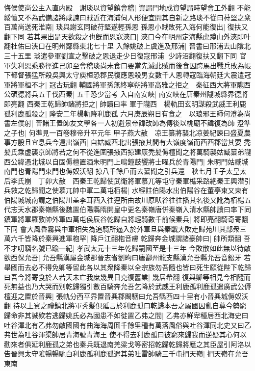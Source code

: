 悔侯使尚公主入直内殿　謝琰以資望鎮會稽|{
	資謂門地成資望謂時望會工外翻}
不能綏懷又不為武備諸將咸諫曰賊近在海浦伺人形便宜開其自新之路琰不從曰苻堅之衆百萬尚送死淮南|{
	琰與謝玄同破苻堅遂輕孫恩}
孫恩小賊敗死入海何能復出|{
	復扶又翻下同}
若其果出是天欲殺之也旣而恩寇浹口|{
	浹口今在明州定海縣虎蹲山外浹即叶翻杜佑曰浹口在明州鄮縣東北七十里}
入餘姚破上虞進及邢浦|{
	晉書曰邢浦去山陰北三十五里}
琰遣參軍劉宣之擊破之恩退走少日復寇邢浦|{
	少詩沼翻復扶又翻下同}
官軍失利恩乘勝徑進己卯至會稽琰尚未食曰要當先滅此賊而後食因跨馬出戰兵敗為帳下都督張猛所殺吳興太守庾桓恐郡民復應恩殺男女數千人恩轉寇臨海朝廷大震遣冠軍將軍桓不才|{
	冠古玩翻}
輔國將軍孫無終寧朔將軍高雅之拒之　秦征西大將軍隴西公碩德將兵五千伐西秦|{
	五千恐少當考}
入自南安峽|{
	南安峽在唐秦州隴城縣界德將即亮翻}
西秦王乾歸帥諸將拒之|{
	帥讀曰率}
軍于隴西　楊軌田玄明謀殺武威王利鹿孤利鹿孤殺之|{
	隆安二年楊軌降利鹿孤}
六月庚辰朔日有食之　以琅邪王師何澄為尚書左僕射|{
	晉諸王置師友文學各一人初避景帝諱改師為傅後以桃廟不諱復為師}
澄準之子也|{
	何準見一百卷穆帝升平元年}
甲子燕大赦　凉王纂將襲北凉姜紀諫曰盛夏農事方殷且宜息兵今遠出嶺西|{
	自姑臧西北出張掖其間有大嶺度嶺而西西郡當其要}
秃髪氏乘虚襲京師將若之何不從進圍張掖西掠建康秃髪傉檀聞之將萬騎襲姑臧纂弟隴西公緯憑北城以自固傉檀置酒朱明門上鳴鐘鼓饗將士曜兵於青陽門|{
	朱明門姑臧城南門也青陽門東門也傉奴沃翻}
掠八千餘戶而去纂聞之引兵還　秋七月壬子太皇太后李氏崩　丁卯大赦　西秦王乾歸使武衛將軍慕兀等屯守秦軍樵采路絶秦王興潜引兵救之乾歸聞之使慕兀帥中軍二萬屯栢楊|{
	水經註伯陽水出伯陽谷在董亭東又東有伯陽城城南謂之伯陽川盖李耳西入往逕所由故川原畎谷往往播其名後又訛為栢楊五代志天水郡秦嶺縣後魏置伯陽縣隋開皇中更名秦嶺唐併秦嶺入清水縣帥讀曰率下同}
鎮軍將軍羅敦帥外軍四萬屯侯辰谷乾歸自將輕騎數千前候秦兵|{
	將即亮翻騎奇寄翻下同}
會大風昏霧與中軍相失為追騎所逼入於外軍旦與秦戰大敗走歸苑川其部衆三萬六千皆降於秦興進軍枹罕|{
	降戶江翻枹音膚}
乾歸奔金城謂諸豪帥曰|{
	帥所類翻}
吾不才叨竊名號已踰一紀|{
	孝武太元十三年乾歸嗣國至是十三年}
今敗散如此無以待敵欲西保允吾|{
	允吾縣漢屬金城郡晉志省劉昫曰唐鄯州龍支縣漢允吾縣允吾音鈆牙}
若舉國而去必不得免卿等留此各以其衆降秦以全宗族勿吾隨也皆曰死生願從陛下乾歸曰吾今將寄食於人若天未亡我庶幾異日克復舊業|{
	幾居希翻}
復與卿等相見今相隨而死無益也乃大哭而别乾歸獨引數百騎奔允吾乞降於武威王利鹿孤利鹿孤遣廣武公傉檀迎之置於晉興|{
	張軌分西平界置晉興郡闞駰曰允吾縣西四十里有小晉興城傉奴沃翻}
待以上賓之禮鎮北將軍秃髪俱延言於利鹿孤曰乾歸本吾之屬國因亂自尊今勢窮歸命非其誠欵若逃歸姚氏必為國患不如徙置乙弗之間|{
	乙弗亦鮮卑種居西北海史曰吐谷渾北有乙弗勿敵國國有曲海海周囬千餘里種有萬落風俗與吐谷渾同北史又曰乙弗世為吐谷渾渠帥居青海號青海王}
使不得去利鹿孤曰彼窮來歸我而逆疑其心何以勸來者俱延利鹿孤之弟也秦兵既退南羌梁戈等密招乾歸乾歸將應之其臣屋引阿洛以告晉興太守隂暢暢馳白利鹿孤利鹿孤遣其弟吐雷帥騎三千屯捫天嶺|{
	捫天嶺在允吾東南}
